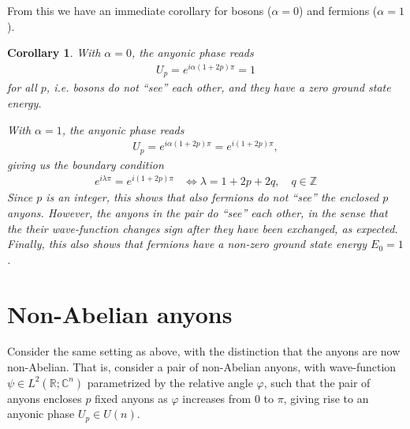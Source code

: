 \documentclass[a4paper,10pt,oneside]{book}
\theoremstyle{plain}
\newtheorem{corollary}[theorem]{Corollary}
\theoremstyle{definition}
\theoremstyle{remark}
\begin{document}
From this we have an immediate corollary for bosons ($\alpha = 0$) and fermions ($\alpha = 1$).

\begin{corollary}
  With $\alpha = 0$, the anyonic phase reads
  \begin{align*}
    U_p = e^{i\alpha(1+2p)π} = 1
  \end{align*}
  for all $p$, i.e. bosons do not ``see'' each other, and they have a zero ground state energy.

  With $\alpha = 1$, the anyonic phase reads
  \begin{align*}
    U_p = e^{i\alpha(1+2p)π} = e^{i(1+2p)π},
  \end{align*}
  giving us the boundary condition
  \begin{align*}
    e^{iλ π} = e^{i(1+2p)π} &\iff λ = 1 + 2p + 2q, \quad q \in \mathbb{Z}
  \end{align*}
  Since $p$ is an integer, this shows that also fermions do not ``see'' the enclosed $p$ anyons.
  However, the anyons in the pair do ``see'' each other, in the sense that the their wave-function changes sign after they have been exchanged, as expected. Finally, this also shows that fermions have a non-zero ground state energy $E_0 = 1$.
\end{corollary}












\section{Non-Abelian anyons}

Consider the same setting as above, with the distinction that the anyons are now non-Abelian. That is, consider a pair of non-Abelian anyons, with wave-function $\psi \in L^2(\mathbb{R}; \mathbb{C}^n)$ parametrized by the relative angle $\varphi$, such that the pair of anyons encloses $p$ fixed anyons as $\varphi$ increases from $0$ to $π$, giving rise to an anyonic phase $U_p \in U(n)$.



\end{document}
